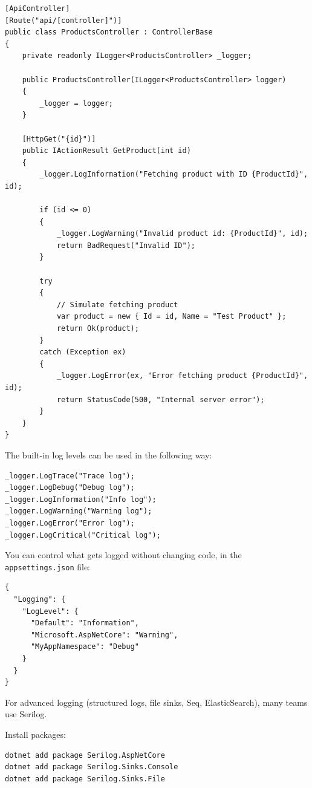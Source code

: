 \begin{lstlisting}
[ApiController]
[Route("api/[controller]")]
public class ProductsController : ControllerBase
{
    private readonly ILogger<ProductsController> _logger;

    public ProductsController(ILogger<ProductsController> logger)
    {
        _logger = logger;
    }

    [HttpGet("{id}")]
    public IActionResult GetProduct(int id)
    {
        _logger.LogInformation("Fetching product with ID {ProductId}", id);

        if (id <= 0)
        {
            _logger.LogWarning("Invalid product id: {ProductId}", id);
            return BadRequest("Invalid ID");
        }

        try
        {
            // Simulate fetching product
            var product = new { Id = id, Name = "Test Product" };
            return Ok(product);
        }
        catch (Exception ex)
        {
            _logger.LogError(ex, "Error fetching product {ProductId}", id);
            return StatusCode(500, "Internal server error");
        }
    }
}

\end{lstlisting}


The built-in log levels can be used in the following way:

\begin{lstlisting}
_logger.LogTrace("Trace log");
_logger.LogDebug("Debug log");
_logger.LogInformation("Info log");
_logger.LogWarning("Warning log");
_logger.LogError("Error log");
_logger.LogCritical("Critical log");
\end{lstlisting}

You can control what gets logged without changing code, in the \verb"appsettings.json" file:

\begin{lstlisting}
{
  "Logging": {
    "LogLevel": {
      "Default": "Information",
      "Microsoft.AspNetCore": "Warning",
      "MyAppNamespace": "Debug"
    }
  }
}

\end{lstlisting}


For advanced logging (structured logs, file sinks, Seq, ElasticSearch), many teams use Serilog.

Install packages:

\begin{lstlisting}
dotnet add package Serilog.AspNetCore
dotnet add package Serilog.Sinks.Console
dotnet add package Serilog.Sinks.File

\end{lstlisting}

